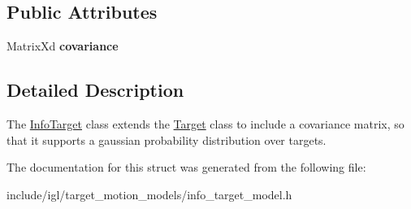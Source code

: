 \subsection*{Public Attributes}
\begin{DoxyCompactItemize}
\item 
\mbox{\label{structnx_1_1InfoTarget_a74fe130d7cc4f682e7f0d8bab46a8440}} 
Matrix\+Xd {\bfseries covariance}
\end{DoxyCompactItemize}


\subsection{Detailed Description}
The \hyperlink{structnx_1_1InfoTarget}{Info\+Target} class extends the \hyperlink{structnx_1_1Target}{Target} class to include a covariance matrix, so that it supports a gaussian probability distribution over targets. 

The documentation for this struct was generated from the following file\+:\begin{DoxyCompactItemize}
\item 
include/igl/target\+\_\+motion\+\_\+models/info\+\_\+target\+\_\+model.\+h\end{DoxyCompactItemize}

